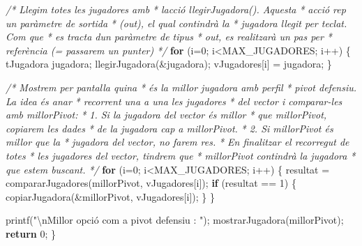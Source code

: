 \documentclass[
]{book}
\newenvironment{Shaded}{\begin{snugshade}}{\end{snugshade}}
\newcommand{\CommentTok}[1]{\textcolor[rgb]{0.56,0.35,0.01}{\textit{#1}}}
\newcommand{\ControlFlowTok}[1]{\textcolor[rgb]{0.13,0.29,0.53}{\textbf{#1}}}
\newcommand{\DecValTok}[1]{\textcolor[rgb]{0.00,0.00,0.81}{#1}}
\newcommand{\NormalTok}[1]{#1}
\newcommand{\SpecialCharTok}[1]{\textcolor[rgb]{0.00,0.00,0.00}{#1}}
\newcommand{\StringTok}[1]{\textcolor[rgb]{0.31,0.60,0.02}{#1}}
\begin{document}
\begin{Shaded}
\begin{Highlighting}[]
    \CommentTok{/* Llegim totes les jugadores amb }
\CommentTok{     * l\textquotesingle{}acció llegirJugadora(). Aquesta}
\CommentTok{     * acció rep un paràmetre de sortida}
\CommentTok{     * (out), el qual contindrà la }
\CommentTok{     * jugadora llegit per teclat. Com que}
\CommentTok{     * es tracta d\textquotesingle{}un paràmetre de tipus }
\CommentTok{     * out, es realitzarà un pas per }
\CommentTok{     * referència (= passarem un punter)}
\CommentTok{     */}
    \ControlFlowTok{for}\NormalTok{ (i=}\DecValTok{0}\NormalTok{; i\textless{}MAX\_JUGADORES; i++) \{}
\NormalTok{        tJugadora jugadora;}
\NormalTok{        llegirJugadora(\&jugadora);}
\NormalTok{        vJugadores[i] = jugadora;}
\NormalTok{    \}}

    \CommentTok{/* Mostrem per pantalla quina}
\CommentTok{     * és la millor jugadora amb perfil}
\CommentTok{     * pivot defensiu. La idea és anar}
\CommentTok{     * recorrent una a una les jugadores}
\CommentTok{     * del vector i comparar{-}les amb millorPivot:}
\CommentTok{     * 1. Si la jugadora del vector és millor}
\CommentTok{     *    que millorPivot, copiarem les dades}
\CommentTok{     *    de la jugadora cap a millorPivot.}
\CommentTok{     * 2. Si millorPivot és millor que la}
\CommentTok{     *    jugadora del vector, no farem res.}
\CommentTok{     * En finalitzar el recorregut de totes}
\CommentTok{     * les jugadores del vector, tindrem que}
\CommentTok{     * millorPivot contindrà la jugadora}
\CommentTok{     * que estem buscant.}
\CommentTok{     */}
    \ControlFlowTok{for}\NormalTok{ (i=}\DecValTok{0}\NormalTok{; i\textless{}MAX\_JUGADORES; i++) \{}
\NormalTok{        resultat = compararJugadores(millorPivot, vJugadores[i]);}
        \ControlFlowTok{if}\NormalTok{ (resultat == }\DecValTok{1}\NormalTok{) \{}
\NormalTok{            copiarJugadora(\&millorPivot, vJugadores[i]);}
\NormalTok{        \}}
\NormalTok{    \}}

\NormalTok{    printf(}\StringTok{"}\SpecialCharTok{\textbackslash{}n}\StringTok{Millor opció com a pivot defensiu : "}\NormalTok{);}
\NormalTok{    mostrarJugadora(millorPivot);}
    \ControlFlowTok{return} \DecValTok{0}\NormalTok{;}
\NormalTok{\}}


\end{Highlighting}
\end{Shaded}
\end{document}

